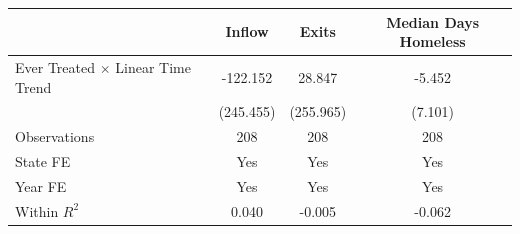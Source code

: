 \begin{tabular}{lccc}
\toprule
 & Inflow & Exits & Median Days Homeless \\
\midrule
Ever Treated $\times$ Linear Time Trend & -122.152 & 28.847 & -5.452 \\
 & (245.455) & (255.965) & (7.101) \\
Observations & 208 & 208 & 208 \\
State FE & Yes & Yes & Yes \\
Year FE & Yes & Yes & Yes \\
Within $R^2$ & 0.040 & -0.005 & -0.062 \\
\bottomrule
\end{tabular}
